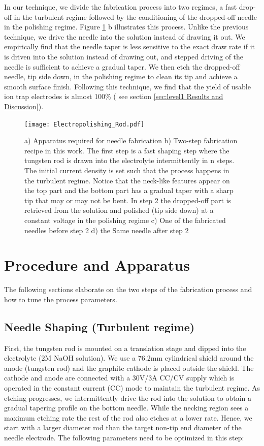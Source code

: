 \documentclass[%
 aip,
 amsmath,amssymb,
 reprint,%
]{revtex4-1}
\begin{document}
In our technique, we divide the fabrication process into two regimes, a fast drop-off in the turbulent regime followed by the conditioning of the dropped-off needle in the polishing regime.
Figure \ref{needle_polishing_basic_idea} b illustrates this process.
Unlike the previous technique, \cite{Wang2016} we drive the needle into the solution instead of drawing it out.
We empirically find that the needle taper is less sensitive to the exact draw rate if it is driven into the solution instead of drawing out, and stepped driving of the needle is sufficient to achieve a gradual taper.
We then etch the dropped-off needle, tip side down, in the polishing regime to clean its tip and achieve a smooth surface finish.
Following this technique, we find that the yield of usable ion trap electrodes is almost 100\% ( see section \ref{sec:level1 Results and Discussion}).

\begin{figure}
    \centering
    \texttt{[image: Electropolishing\_Rod.pdf]}
    \caption{a) Apparatus required for needle fabrication b) Two-step fabrication recipe in this work. 
    The first step is a fast shaping step where the tungsten rod is drawn into the electrolyte intermittently in n steps. 
    The initial current density is set such that the process happens in the turbulent regime. 
    Notice that the neck-like features appear on the top part and the bottom part has a gradual taper with a sharp tip that may or may not be bent. 
    In step 2 the dropped-off part is retrieved from the solution and polished (tip side down) at a constant voltage in the polishing regime c) One of the fabricated needles before step 2 d) the Same needle after step 2}
    \label{needle_polishing_basic_idea}
    
\end{figure}

\section{\label{sec:level1 Procedure and Apparatus}Procedure and Apparatus}
The following sections elaborate on the two steps of the fabrication process and how to tune the process parameters. 

\subsection{\label{sec:level2}Needle Shaping (Turbulent regime) }
First, the tungsten rod is mounted on a translation stage and dipped into the electrolyte (2M NaOH solution). 
We use a 76.2mm cylindrical shield \cite{Wang2016} around the anode (tungsten rod) and the graphite cathode is placed outside the shield. 
The cathode and anode are connected with a 30V/3A CC/CV supply which is operated in the constant current (CC) mode to maintain the turbulent regime. 
As etching progresses, we intermittently drive the rod into the solution to obtain a gradual tapering profile on the bottom needle.
While the necking region sees a maximum etching rate the rest of the rod also etches at a lower rate.
Hence, we start with a larger diameter rod than the target non-tip end diameter of the needle electrode.
The following parameters need to be optimized in this step:
\end{document}
